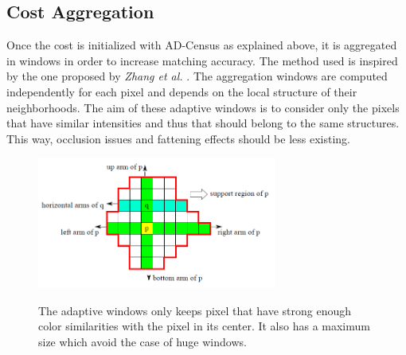 \documentclass{ipol}
\begin{document}
\subsection{ Cost Aggregation }

Once the cost is initialized with AD-Census as explained above, it is aggregated in windows in order to increase matching accuracy. The method used is inspired by the one proposed by \textit{ Zhang et al.} \cite{costAggreg}.
The aggregation windows are computed independently for each pixel and depends on the local structure of their neighborhoods. The aim of these adaptive windows is to consider only the pixels that have similar intensities and thus that should belong to the same structures. This way, occlusion issues and fattening effects should be less existing.\\

\begin{figure}[h]
\begin{center}	
\includegraphics[width=0.7\textwidth]{Images/cost_computation.png}
	\label{cost_computation}
	\caption{ The adaptive windows only keeps pixel that have strong enough color similarities with the pixel in its center. It also has a maximum size which avoid the case of huge windows.}
\end{center}
\end{figure}
\end{document}
